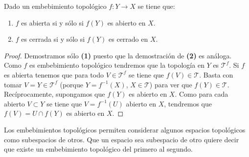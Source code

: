 \begin{prop}
Dado un embebimiento topológico $\displaystyle f : Y \to X $ se tiene que:
\begin{enumerate}
\item $\displaystyle f $ es abierta si y sólo si $\displaystyle f\left(Y\right) $ es abierto en $\displaystyle X $. 
\item $\displaystyle f $ es cerrada si y sólo si $\displaystyle f\left(Y\right) $ es cerrado en $\displaystyle X $. 
\end{enumerate}
\end{prop}
\begin{proof}
Demostramos sólo \textbf{(1)} puesto que la demostración de \textbf{(2)} es análoga. Como $\displaystyle f $ es embebimiento topológico tendremos que la topología en $\displaystyle Y $ es $\displaystyle \mathcal{T}^{f} $. 
Si $\displaystyle f $ es abierta tenemos que para todo $\displaystyle V \in \mathcal{T}^{f} $ se tiene que $\displaystyle f\left(V\right)\in \mathcal{T} $. Basta con tomar $\displaystyle V = Y \in \mathcal{T}^{f} $ (porque $\displaystyle Y =f^{-1}\left(X\right) $, $\displaystyle X \in \mathcal{T} $) para ver que $\displaystyle f\left(Y\right)\in \mathcal{T} $.
Recíprocamente, supongamos que $\displaystyle f\left(Y\right) $ es abierto en $\displaystyle X $. Como para cada abierto $\displaystyle V \subset Y $ se tiene que $\displaystyle V = f^{-1}\left(U\right) $ abierto en $\displaystyle X $, tendremos que $\displaystyle f\left(V\right)=U \cap f\left(Y\right) $ es abierto en $\displaystyle X $. 
\end{proof}

\begin{observation}
Los embebimientos topológicos permiten considerar algunos espacios topológicos como subespacios de otros. Que un espacio sea subespacio de otro quiere decir que existe un embebimiento topológico del primero al segundo.
\end{observation}

